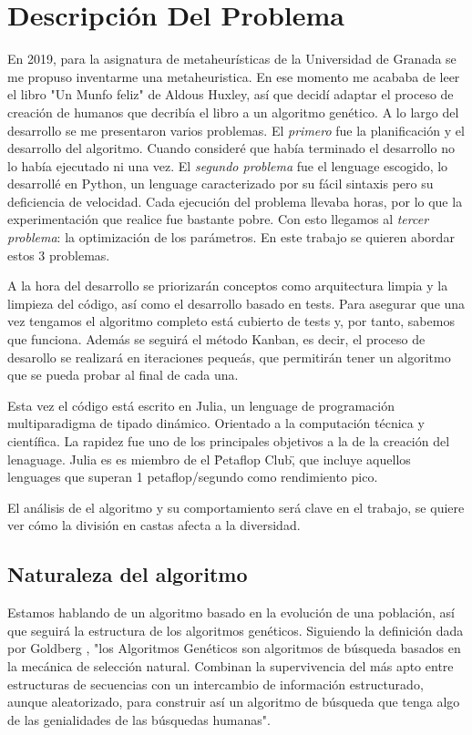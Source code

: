 \chapter{Descripción Del Problema}

En 2019, para la asignatura de metaheurísticas de la Universidad de Granada se me propuso inventarme una metaheuristica. En
ese momento me acababa de leer el libro "Un Munfo feliz" de Aldous Huxley, así que decidí adaptar el proceso de creación 
de humanos que decribía el libro a un algoritmo genético. A lo largo del desarrollo se me presentaron varios problemas. El \textit{primero} fue
la planificación y el desarrollo del algoritmo. Cuando consideré que había terminado el desarrollo no lo había ejecutado ni una vez. El
\textit{segundo problema} fue el lenguage escogido, lo desarrollé en Python, un lenguage caracterizado por su fácil sintaxis pero su deficiencia de
velocidad. Cada ejecución del problema llevaba horas, por lo que la experimentación que realice fue bastante pobre. Con esto llegamos
al \textit{tercer problema}: la optimización de los parámetros. En este trabajo se quieren abordar estos 3 problemas. 

A la hora del desarrollo se priorizarán conceptos como arquitectura limpia \cite{cleanArquitecture2017} y la limpieza del
código, así como el desarrollo basado en tests. Para asegurar que una vez tengamos el algoritmo completo está cubierto de tests y, por tanto, sabemos que funciona. Además
se seguirá el método Kanban, es decir, el proceso de desarollo se realizará en iteraciones pequeás, que permitirán tener un algoritmo que se pueda probar
al final de cada una. 

Esta vez el código está escrito en Julia, un lenguage de programación multiparadigma de tipado dinámico. Orientado a la computación técnica y 
científica. La rapidez fue uno de los principales objetivos a la de la creación del lenaguage. Julia es es miembro de el \"Petaflop Club\", que incluye 
aquellos lenguages que superan 1 petaflop/segundo como rendimiento pico. 

El análisis de el algoritmo y su comportamiento será clave en el trabajo, se quiere ver cómo la división en castas afecta a la diversidad.

\section{Naturaleza del algoritmo}

Estamos hablando de un algoritmo basado en la evolución de una población, así que seguirá la estructura de los
algoritmos genéticos. Siguiendo la definición dada por Goldberg \cite{goldberg89}, "los Algoritmos Genéticos son algoritmos de búsqueda
basados en la mecánica de selección natural. Combinan la supervivencia del más apto entre estructuras de secuencias con un intercambio de 
información estructurado, aunque aleatorizado, para construir así un algoritmo
de búsqueda que tenga algo de las genialidades de las búsquedas humanas".

